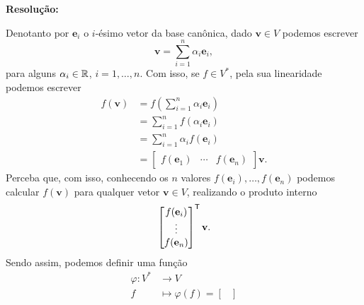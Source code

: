 \documentclass[leqno]{article}
\numberwithin{equation}{section}
\newcommand{\bfv}{\mathbf{v}}
\newcommand{\bfe}{\mathbf{e}}
\newenvironment{sol}
{
    \vspace{4mm}
    \noindent\textbf{Resolução:}
    \strut\newline
    \smallskip
    \hspace{-3.5mm}
}
{}
\begin{document}
\begin{enumerate}
\begin{enumerate}
                \begin{sol} 
                    Denotanto por \( \bfe_{ i } \) o \( i \)-ésimo vetor da base canônica, dado \( \bfv \in V \) podemos escrever
                    \begin{equation*}
                        \bfv = \sum_{ i=1 }^{ n } \alpha_{ i } \bfe_{ i }
                    ,\end{equation*}
                    para alguns \( \alpha_{ i } \in \mathbb{R} \), \( i = 1, \dots, n \).
                    Com isso, se \( f \in V^{ * } \), pela sua linearidade podemos escrever
                    \begin{align*}
                        f ( \bfv )
                        &= f \left(
                            \sum_{ i=1 }^{ n } \alpha_{ i } \bfe_{ i }
                        \right) \\
                        &= \sum_{ i=1 }^{ n } f ( \alpha_{ i } \bfe_{ i } ) \\
                        &= \sum_{ i=1 }^{ n } \alpha_{ i } f ( \bfe_{ i } ) \\
                        &=
                        \begin{bmatrix}
                            f ( \bfe_{ 1 } ) & \cdots & f ( \bfe_{ n } )
                        \end{bmatrix}
                        \bfv
                    .\end{align*}
                    Perceba que, com isso, conhecendo os \( n \) valores \( f ( \bfe_{ i } ), \dots, f ( \bfe_{ n } ) \) podemos calcular \( f ( \bfv ) \) para qualquer vetor \( \bfv \in V \), realizando o produto interno
                    \begin{equation*}
                        \begin{bmatrix}
                            f ( \bfe_{ i } ) \\
                            \vdots \\
                            f ( \bfe_{ n } )
                        \end{bmatrix}^{ \transpose }
                        \bfv
                    .\end{equation*}
                    Sendo assim, podemos definir uma função
                    \begin{align*}
                        \varphi : V^{ * } &\to V \\
                        f &\mapsto \varphi ( f ) =
                        \begin{bmatrix}

\end{bmatrix}
\end{align*}
\end{sol}
\end{enumerate}
\end{enumerate}
\end{document}
